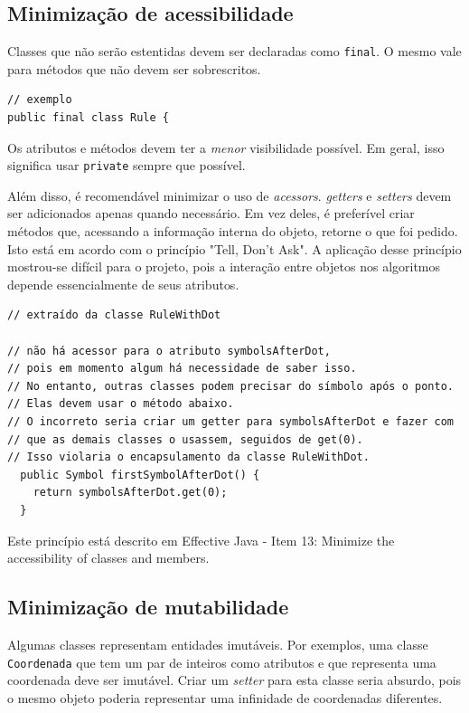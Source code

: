 \documentclass[11pt]{article}
\begin{document}
\subsection{Minimização de acessibilidade}
\label{sec:orgheadline18}
Classes que não serão estentidas devem ser declaradas como \texttt{final}. O mesmo vale
para métodos que não devem ser sobrescritos.

\begin{verbatim}
// exemplo
public final class Rule {
\end{verbatim}

Os atributos e métodos devem ter a \emph{menor} visibilidade possível. Em
geral, isso significa usar \texttt{private} sempre que possível.

Além disso, é recomendável minimizar o uso de \emph{acessors}. \emph{getters} e \emph{setters}
devem ser adicionados apenas quando necessário. Em vez deles, é preferível criar
métodos que, acessando a informação interna do objeto, retorne o que foi pedido.
Isto está em acordo com o princípio "Tell, Don't Ask". A aplicação desse
princípio mostrou-se difícil para o projeto, pois a interação entre objetos nos
algoritmos depende essencialmente de seus atributos.

\begin{verbatim}
// extraído da classe RuleWithDot

// não há acessor para o atributo symbolsAfterDot,
// pois em momento algum há necessidade de saber isso.
// No entanto, outras classes podem precisar do símbolo após o ponto.
// Elas devem usar o método abaixo.
// O incorreto seria criar um getter para symbolsAfterDot e fazer com
// que as demais classes o usassem, seguidos de get(0).
// Isso violaria o encapsulamento da classe RuleWithDot.
  public Symbol firstSymbolAfterDot() {
    return symbolsAfterDot.get(0);
  }
\end{verbatim}

Este princípio está descrito em Effective Java - Item 13: Minimize the accessibility of classes and members.

\subsection{Minimização de mutabilidade}
\label{sec:orgheadline19}
Algumas classes representam entidades imutáveis. Por exemplos, uma classe \texttt{Coordenada}
que tem um par de inteiros como atributos e que representa uma coordenada deve
ser imutável. Criar um \emph{setter} para esta classe seria absurdo, pois o mesmo
objeto poderia representar uma infinidade de coordenadas diferentes.
\end{document}
